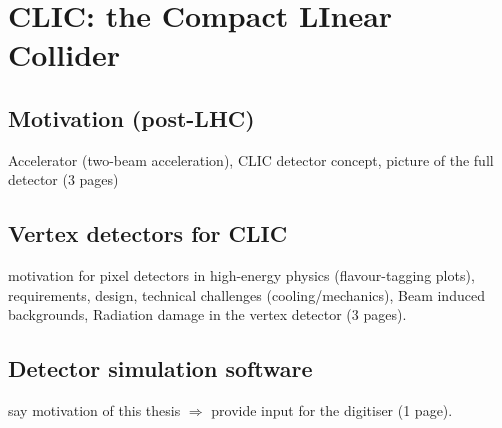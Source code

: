 \chapter{CLIC: the Compact LInear Collider}
\label{ch:CLIC}

\section{Motivation (post-LHC)}
Accelerator (two-beam acceleration), CLIC detector concept, picture of
the full detector (3 pages)

\section{Vertex detectors for CLIC}
motivation for pixel detectors in high-energy physics (flavour-tagging
plots), requirements, design, technical challenges
(cooling/mechanics), Beam induced backgrounds, Radiation damage in the
vertex detector (3 pages).


\section{Detector simulation software}
say motivation of this thesis $\Rightarrow$ provide input for the
digitiser (1 page).
